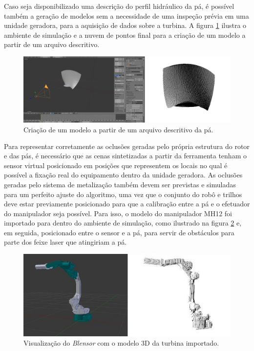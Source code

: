 Caso seja disponibilizado uma descrição do perfil hidráulico da pá, é possível
também a geração de modelos sem a necessidade de uma inspeção prévia em uma
unidade geradora, para a aquisição de
dados sobre a turbina. A figura \ref{fig::modelo_pa} ilustra o ambiente de simulação e a
nuvem de pontos final para a criação de um modelo a partir de um arquivo
descritivo. 


\begin{figure}[h!]
	\centering
	\includegraphics[width=0.9\columnwidth]{method/figs/calibracao/blensor_pa_sim}
	\caption{Criação de um modelo a partir de um arquivo descritivo da pá.}
    \label{fig::modelo_pa}
\end{figure}

Para representar corretamente as oclusões geradas pelo própria estrutura do
rotor e das pás, é necessário que as cenas sintetizadas a partir da ferramenta
tenham o sensor virtual posicionado em posições que representem os locais no
qual é possível a fixação real do equipamento dentro da unidade geradora. As
oclusões geradas pelo sistema de metalização também devem ser previstas e simuladas para um
perfeito ajuste do algoritmo, uma vez que o conjunto do robô e trilhos deve
estar previamente posicionado para que a calibração entre a pá e o efetuador do
manipulador seja possível. Para isso, o modelo do manipulador MH12 foi
importado para dentro do ambiente de simulação, como ilustrado na figura
\ref{fig::model_mh12} e, em seguida, posicionado entre o sensor e a pá, para
servir de obstáculos para parte dos feixe laser que atingiriam a pá.


\begin{figure}[H]
	\centering
	\includegraphics[width=0.9\columnwidth]{method/figs/calibracao/mh12_model}
	\caption{Visualização do \textit{Blensor} com o modelo 3D da turbina
	importado.}
    \label{fig::model_mh12}
\end{figure}

